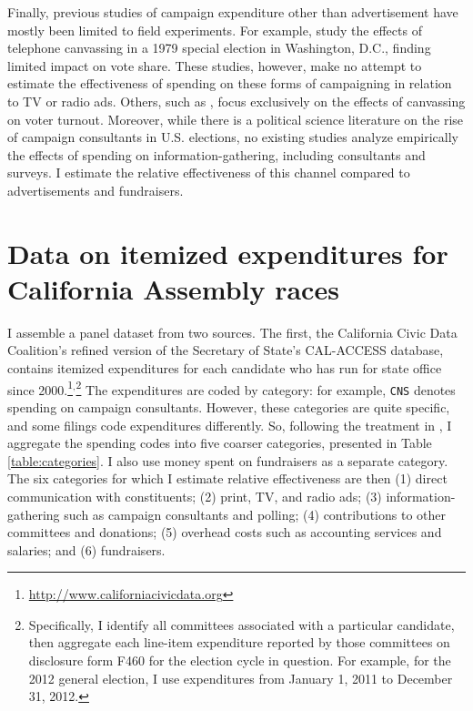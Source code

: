 \documentclass{article}
\begin{document}
Finally, previous studies of campaign expenditure other than advertisement have mostly been limited to field experiments. For example, \cite{adams1980effects} study the effects of telephone canvassing in a 1979 special election in Washington, D.C., finding limited impact on vote share. These studies, however, make no attempt to estimate the effectiveness of spending on these forms of campaigning in relation to TV or radio ads. Others, such as \cite{gerber2000effects}, focus exclusively on the effects of canvassing on voter turnout. Moreover, while there is a political science literature on the rise of campaign consultants in U.S. elections, no existing studies analyze empirically the effects of spending on information-gathering, including consultants and surveys. I estimate the relative effectiveness of this channel compared to advertisements and fundraisers.

\section{Data on itemized expenditures for California Assembly races}

I assemble a panel dataset from two sources. The first, the California Civic Data Coalition's refined version of the Secretary of State's CAL-ACCESS database, contains itemized expenditures for each candidate who has run for state office since 2000.\footnote{\url{http://www.californiacivicdata.org}}$^,$\footnote{Specifically, I identify all committees associated with a particular candidate, then aggregate each line-item expenditure reported by those committees on disclosure form F460 for the election cycle in question. For example, for the 2012 general election, I use expenditures from January 1, 2011 to December 31, 2012.} The expenditures are coded by category: for example, \texttt{CNS} denotes spending on campaign consultants. However, these categories are quite specific, and some filings code expenditures differently. So, following the treatment in \cite{ansolabehere1994mismeasure}, I aggregate the spending codes into five coarser categories, presented in Table \ref{table:categories}. I also use money spent on fundraisers as a separate category. The six categories for which I estimate relative effectiveness are then (1) direct communication with constituents; (2) print, TV, and radio ads; (3) information-gathering such as campaign consultants and polling; (4) contributions to other committees and donations; (5) overhead costs such as accounting services and salaries; and (6) fundraisers.
\end{document}
